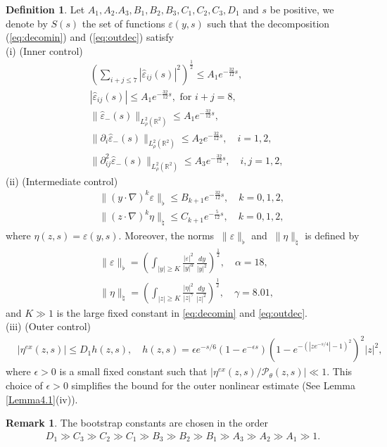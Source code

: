 \documentclass[11pt,reqno]{amsart}
\theoremstyle{definition}
\newtheorem{definition}{Definition}[section]
\theoremstyle{bfremark}
\newtheorem{remark}{Remark}[section]
\numberwithin{equation}{section}
\newcommand{\veph}{\hat\varepsilon }
\begin{document}
\begin{definition}
\label{Definition 3,1}
Let $A_1, A_2.A_3, B_1, B_2, B_3, C_1, C_2, C_3, D_1$ and $s$ be positive, we denote by \(S(s)\) the set of functions \(\varepsilon(y,s)\) such that the decomposition (\ref{eq:decomin}) and (\ref{eq:outdec}) satisfy \\
(i) (Inner control)
\begin{align}
    &\left( \sum_{i+j \leq 7} |\veph_{ij}(s)|^2 \right)^{\frac{1}{2}} \leq A_1 e^{-\frac{32}{12}s},\label{in1}\\
    &|\veph_{ij}(s)| \leq A_1e^{-\frac{32}{12}s}, \text{ for } i+j =8, \label{in2}\\
    &\|\veph_-(s)\|_{L^2_{\rho}(\mathbb{R}^2)} \leq A_1 e^{-\frac{32}{12}s} \label{in3},\\
    &\|\partial_i\veph_-(s)\|_{L^2_{\rho}(\mathbb{R}^2)} \leq A_2 e^{-\frac{32}{12}s}, \quad i=1,2,\label{in4}\\
    &\|\partial^2_{ij}\veph_-(s)\|_{L^2_{\rho}(\mathbb{R}^2)} \leq A_3 e^{-\frac{32}{12}s}, \quad i,j=1,2, \label{in5}
\end{align}
(ii) (Intermediate control)
\begin{align}
    &\|(y \cdot \nabla)^k\varepsilon\|_{\flat} \leq B_{k+1} e^{-\frac{32}{12}s}, \quad k=0,1,2,\label{int1}\\
   \quad  &\|(z \cdot \nabla)^k \eta \|_{\natural} \leq C_{k+1} e^{-\frac{5}{12}s}, \label{bootstrap: int 2} \quad k=0,1,2,
\end{align}
where \(\eta(z,s)= \varepsilon(y,s)\). Moreover, the norms \(\
\|\varepsilon\|_{\flat}\) and \(\
\|\eta\|_{\natural}\) is defined by
\begin{align}
        &\|\varepsilon\|_{\flat}=\left(\int_{|y| \geq K}\frac{|\varepsilon|^2}{|y|^{\alpha}}\,\frac{dy}{|y|^2}\right)^{\frac{1}{2}}, \quad \alpha=18,\label{int2}\\
        &\|\eta\|_{\natural}=\left(\int_{|z| \geq K}\frac{|\eta|^2}{|z|^{\gamma}}\,\frac{dy}{|z|^2}\right)^{\frac{1}{2}}, \quad \gamma=8.01\label{bootstrap: int norm 2},
\end{align}
and \(K\gg 1\) is the large fixed constant in \ref{eq:decomin} and \ref{eq:outdec}.\\
(iii) (Outer control)
\begin{align}
       &|\eta^{ex}(z,s)| \leq D_1h(z,s), \quad h(z,s)=\epsilon e^{-s/6}(1-e^{-\epsilon s})(1-e^{-(|ze^{-s/4}|-1)^2})^2|z|^2,\label{out2}
\end{align}
where \(\epsilon>0\) is a small fixed constant such that \(|\eta^{ex}(z,s)/\mathcal{P}_{\theta}(z,s)| \ll 1\). This choice of \(\epsilon>0\) simplifies the bound for the outer nonlinear estimate (See Lemma \ref{Lemma4.1}(iv)).
\end{definition}
\begin{remark}The bootstrap constants are chosen in the order 
\begin{align*}
     D_1 \gg C_3 \gg C_2 \gg C_1 \gg B_3\gg B_2\gg B_1\gg A_3\gg A_2 \gg A_1 \gg 1.
\end{align*}
\end{remark}
\end{document}

